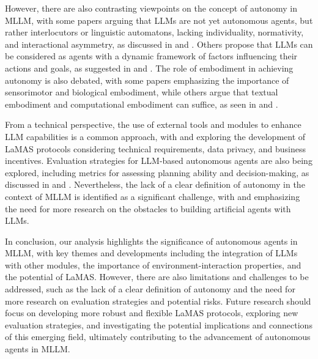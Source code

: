\documentclass[conference]{IEEEtran}
\begin{document}
However, there are also contrasting viewpoints on the concept of autonomy in MLLM, with some papers arguing that LLMs are not yet autonomous agents, but rather interlocutors or linguistic automatons, lacking individuality, normativity, and interactional asymmetry, as discussed in \cite{2407.10735} and \cite{2407.01489}. Others propose that LLMs can be considered as agents with a dynamic framework of factors influencing their actions and goals, as suggested in \cite{2405.06643} and \cite{2310.08535}. The role of embodiment in achieving autonomy is also debated, with some papers emphasizing the importance of sensorimotor and biological embodiment, while others argue that textual embodiment and computational embodiment can suffice, as seen in \cite{2403.11381} and \cite{2412.04093}.

From a technical perspective, the use of external tools and modules to enhance LLM capabilities is a common approach, with \cite{2404.13501} and \cite{2012.12600} exploring the development of LaMAS protocols considering technical requirements, data privacy, and business incentives. Evaluation strategies for LLM-based autonomous agents are also being explored, including metrics for assessing planning ability and decision-making, as discussed in \cite{2308.05960} and \cite{2409.14457}. Nevertheless, the lack of a clear definition of autonomy in the context of MLLM is identified as a significant challenge, with \cite{2402.02716} and \cite{2407.16190} emphasizing the need for more research on the obstacles to building artificial agents with LLMs.

In conclusion, our analysis highlights the significance of autonomous agents in MLLM, with key themes and developments including the integration of LLMs with other modules, the importance of environment-interaction properties, and the potential of LaMAS. However, there are also limitations and challenges to be addressed, such as the lack of a clear definition of autonomy and the need for more research on evaluation strategies and potential risks. Future research should focus on developing more robust and flexible LaMAS protocols, exploring new evaluation strategies, and investigating the potential implications and connections of this emerging field, ultimately contributing to the advancement of autonomous agents in MLLM.
\end{document}
